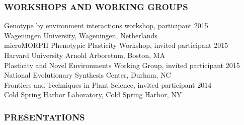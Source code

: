 \documentclass[12pt,english]{article}
\begin{document}
\subsubsection*{WORKSHOPS AND WORKING GROUPS}
\vspace{-0.5ex}
\hspace*{1.0em} Genotype by environment interactions workshop, participant
\hfill 
2015\\
\hspace*{2.0em}  Wageningen University, Wageningen, Netherlands
\vspace{1ex}\\
\hspace*{1.0em} microMORPH Phenotypic Plasticity Workshop, invited participant
\hfill 
2015\\
\hspace*{2.0em}  Harvard University Arnold Arboretum, Boston, MA
\vspace{1ex}\\
\hspace*{1.0em} Plasticity and Novel Environments Working Group, invited participant
\hfill 
2015\\
\hspace*{2.0em}  National Evolutionary Synthesis Center, Durham, NC
\vspace{1ex}\\
\hspace*{1.0em} Frontiers and Techniques in Plant Science, invited participant
\hfill 
2014\\
\hspace*{2.0em}  Cold Spring Harbor Laboratory, Cold Spring Harbor, NY
\vspace{1ex}


\subsubsection*{PRESENTATIONS}
\vspace{-0.5ex}
\end{document}

